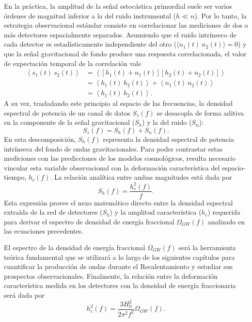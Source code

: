 En la práctica, la amplitud de la señal estocástica primordial suele ser varios órdenes de magnitud inferior a la del ruido instrumental ($h \ll n$). Por lo tanto, la estrategia observacional estándar consiste en correlacionar las mediciones de dos o más detectores espacialmente separados. Asumiendo que el ruido intrínseco de cada detector es estadísticamente independiente del otro ($\langle n_1(t) ~ n_2(t) \rangle = 0$) y que la señal gravitacional de fondo produce una respuesta correlacionada, el valor de expectación temporal de la correlación vale
\begin{equation}
    \begin{aligned}
        \left\langle s_1 (t) ~ s_2 (t) \right\rangle &= \left\langle \left[ h_1 (t) + n_1 (t) \right] \left[ h_2 (t) + n_2 (t) \right] \right\rangle \\
        &= \left\langle h_1 (t) ~ h_2 (t) \right\rangle + \left\langle n_1 (t) ~ n_2 (t) \right\rangle \\
        &= \left\langle h_1 (t) ~ h_2 (t) \right\rangle.
    \end{aligned}
\end{equation}
A su vez, trasladando este principio al espacio de las frecuencias, la densidad espectral de potencia de un canal de datos $S_s(f)$ se desacopla de forma aditiva en la componente de la señal gravitacional ($S_h$) y la del ruido ($S_n$):
\begin{equation}
    S_s(f) = S_h(f) + S_n(f).
\end{equation}
En esta descomposición, $S_h(f)$ representa la densidad espectral de potencia intrínseca del fondo de ondas gravitacionales. Para poder contrastar estas mediciones con las predicciones de los modelos cosmológicos, resulta necesario vincular esta variable observacional con la deformación característica del espacio-tiempo, $h_c(f)$. La relación analítica entre ambas magnitudes está dada por \cite{Christensen_2018}
\begin{equation}
    S_h(f) = \frac{h_c^2(f)}{f}.
\end{equation}
Esta expresión provee el nexo matemático directo entre la densidad espectral extraída de la red de detectores ($S_h$) y la amplitud característica ($h_c$) requerida para derivar el espectro de densidad de energía fraccional $\Omega_{GW}(f)$ analizado en las ecuaciones precedentes.

El espectro de la densidad de energía fraccional $\Omega_{GW} (f)$ será la herramienta teórica fundamental que se utilizará a lo largo de los siguientes capítulos para cuantificar la producción de ondas durante el Recalentamiento y estudiar sus prospectos observacionales. Finalmente, la relación entre la deformación característica medida en los detectores con la densidad de energía fraccionaria será dada por \cite{Christensen_2018}
\begin{equation}\label{eqn:strain}
    h_c^2 (f) = \frac{3 H_0^2}{2\pi^2 f^2} \Omega_{GW} (f).
\end{equation}

